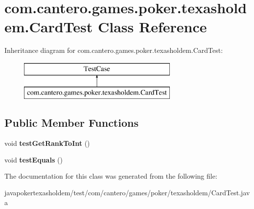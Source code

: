 \hypertarget{classcom_1_1cantero_1_1games_1_1poker_1_1texasholdem_1_1_card_test}{}\section{com.\+cantero.\+games.\+poker.\+texasholdem.\+Card\+Test Class Reference}
\label{classcom_1_1cantero_1_1games_1_1poker_1_1texasholdem_1_1_card_test}
Inheritance diagram for com.\+cantero.\+games.\+poker.\+texasholdem.\+Card\+Test\+:\begin{figure}[H]
\begin{center}
\leavevmode
\includegraphics[height=2.000000cm]{classcom_1_1cantero_1_1games_1_1poker_1_1texasholdem_1_1_card_test}
\end{center}
\end{figure}
\subsection*{Public Member Functions}
\begin{DoxyCompactItemize}
\item 
\hypertarget{classcom_1_1cantero_1_1games_1_1poker_1_1texasholdem_1_1_card_test_a76817712e45692b1802d3151aaa82ce8}{}void {\bfseries test\+Get\+Rank\+To\+Int} ()\label{classcom_1_1cantero_1_1games_1_1poker_1_1texasholdem_1_1_card_test_a76817712e45692b1802d3151aaa82ce8}

\item 
\hypertarget{classcom_1_1cantero_1_1games_1_1poker_1_1texasholdem_1_1_card_test_a6530a32d314bef9f62771653dc293685}{}void {\bfseries test\+Equals} ()\label{classcom_1_1cantero_1_1games_1_1poker_1_1texasholdem_1_1_card_test_a6530a32d314bef9f62771653dc293685}

\end{DoxyCompactItemize}


The documentation for this class was generated from the following file\+:\begin{DoxyCompactItemize}
\item 
javapokertexasholdem/test/com/cantero/games/poker/texasholdem/Card\+Test.\+java\end{DoxyCompactItemize}
